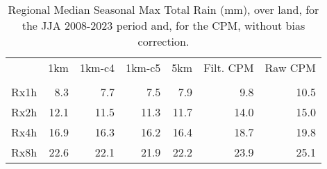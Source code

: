 \begin{table}[ht!]
\caption{Regional Median Seasonal Max Total Rain (mm), over land,  for the JJA 2008-2023 period and, for the CPM,  without bias correction.}
\label{tab:max_rain}
\begin{tabular}{lrrrrrr}
\toprule
 & 1km & 1km-c4 & 1km-c5 & 5km & Filt. CPM & Raw CPM \\
 &  &  &  &  &  &  \\
\midrule
Rx1h & 8.3 & 7.7 & 7.5 & 7.9 & 9.8 & 10.5 \\
Rx2h & 12.1 & 11.5 & 11.3 & 11.7 & 14.0 & 15.0 \\
Rx4h & 16.9 & 16.3 & 16.2 & 16.4 & 18.7 & 19.8 \\
Rx8h & 22.6 & 22.1 & 21.9 & 22.2 & 23.9 & 25.1 \\
\bottomrule
\end{tabular}
\end{table}

